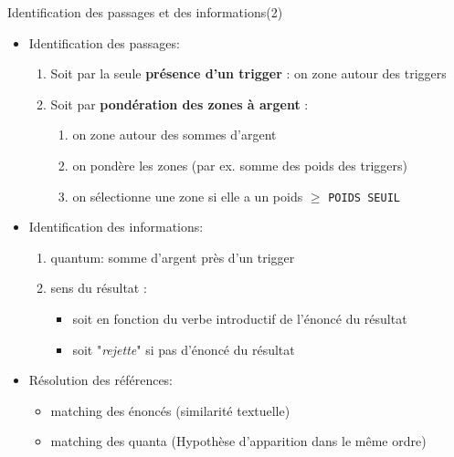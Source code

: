 \documentclass[newPxFont,pagenumber]{beamer}
\begin{document}
\begin{frame}{Identification des passages et des informations(2)}
\begin{itemize}
\item Identification des passages: 
\begin{enumerate}
\item Soit par la seule \textbf{présence d'un trigger} : on zone autour des triggers 
\item Soit par \textbf{pondération des zones à argent}  : 
\begin{enumerate}
\item on zone autour des sommes d'argent
\item on pondère les zones (par ex. somme des poids des triggers)
\item on sélectionne une zone si elle a un poids $\geq$ \texttt{POIDS SEUIL}
\end{enumerate}
\end{enumerate}
\item Identification des informations:
\begin{enumerate}
\item quantum: somme d'argent près d'un trigger
\item sens du résultat : 
\begin{itemize}
\item soit en fonction du verbe introductif de l'énoncé du résultat
\item soit "\textit{rejette}" si pas d'énoncé du résultat
\end{itemize}
\end{enumerate}
\item Résolution des références:
\begin{itemize}
\item matching des énoncés (similarité textuelle)
\item matching des quanta (Hypothèse d'apparition dans le même ordre)
\end{itemize}
\end{itemize}
\end{frame}
\end{document}
